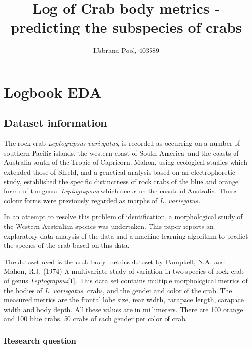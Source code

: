 \documentclass[
]{article}
\title{Log of Crab body metrics - predicting the subspecies of crabs}
\author{IJsbrand Pool, 403589}
\date{}
\begin{document}
\maketitle

{
\hypersetup{linkcolor=}
\setcounter{tocdepth}{2}
\tableofcontents
}
\newpage

\hypertarget{logbook-eda}{%
\section{Logbook EDA}\label{logbook-eda}}

\hypertarget{dataset-information}{%
\subsection{Dataset information}\label{dataset-information}}

The rock crab \emph{Leptograpsus variegatus}, is recorded as occurring
on a number of southern Pacific islands, the western coast of South
America, and the coasts of Australia south of the Tropic of Capricorn.
Mahon, using ecological studies which extended those of Shield, and a
genetical analysis based on an electrophoretic study, established the
specific distinctness of rock crabs of the blue and orange forms of the
genus \emph{Leptograpsus} which occur on the coasts of Australia. These
colour forms were previously regarded as morphs of \emph{L. variegatus.}

In an attempt to resolve this problem of identification, a morphological
study of the Western Australian species was undertaken. This paper
reports an exploratory data analysis of the data and a machine learning
algorithm to predict the species of the crab based on this data.

The dataset used is the crab body metrics dataset by Campbell, N.A. and
Mahon, R.J. (1974) A multivariate study of variation in two species of
rock crab of genus \emph{Leptograpsus}{[}1{]}. This data set contains
multiple morphological metrics of the bodies of \emph{L. variegatus.}
crabs, and the gender and color of the crab. The measured metrics are
the frontal lobe size, rear width, carapace length, carapace width and
body depth. All these values are in millimeters. There are 100 orange
and 100 blue crabs. 50 crabs of each gender per color of crab.

\hypertarget{research-question}{%
\subsubsection{Research question}\label{research-question}}
\end{document}
